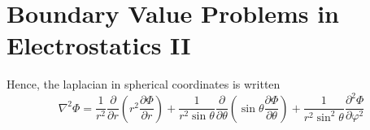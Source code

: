 \chapter{Boundary Value Problems in Electrostatics II} 

Hence, the laplacian in spherical coordinates is written
\begin{equation}
\nabla^2 \Phi = \frac{1}{r^2}\frac{\partial}{\partial r} \left( r^2 \frac{\partial \Phi}{\partial r} \right) + \frac{1}{r^2 \sin \theta} \frac{\partial}{\partial \theta} \left( \sin \theta \frac{\partial \Phi}{\partial \theta} \right)+ \frac{1}{r^2 \sin^2 \theta} \frac{\partial ^2 \Phi}{\partial \varphi ^2} 
\end{equation}
